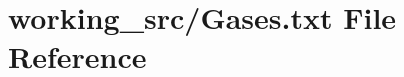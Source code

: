 \hypertarget{_gases_8txt}{}\section{working\+\_\+src/\+Gases.txt File Reference}
\label{_gases_8txt}
